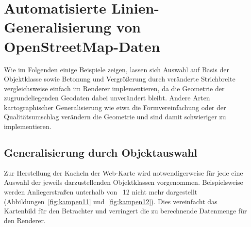 \documentclass[../main/thesis.tex]{subfiles}
\begin{document}




\section{Automatisierte Linien-Generalisierung von OpenStreetMap-Daten}

Wie im Folgenden einige Beispiele zeigen, lassen sich Auswahl auf Basis der Objektklasse sowie Betonung und Vergrößerung durch veränderte Strichbreite vergleichsweise einfach im Renderer implementieren, da die Geometrie der zugrundeliegenden Geodaten dabei unverändert bleibt. Andere Arten kartographischer Generalisierung wie etwa die Formvereinfachung oder der Qualitätsumschlag verändern die Geometrie und sind damit schwieriger zu implementieren.



\subsection{Generalisierung durch Objektauswahl}

Zur Herstellung der Kacheln der Web-Karte wird notwendigerweise für jede  eine Auswahl der jeweils  darzustellenden Objektklassen vorgenommen. Beispielsweise werden Anliegerstraßen  unterhalb von ~12 nicht mehr dargestellt (Abbildungen~\ref{fig:kampen11} und~\ref{fig:kampen12}). Dies vereinfacht das Kartenbild für den Betrachter und verringert die zu berechnende Datenmenge für den Renderer.
\end{document}
